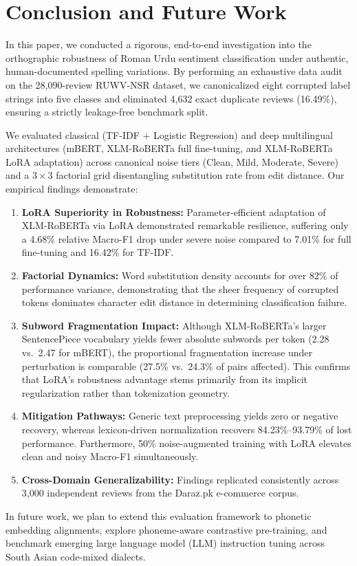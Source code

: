 \section{Conclusion and Future Work}
\label{sec:conclusion}

In this paper, we conducted a rigorous, end-to-end investigation into the orthographic robustness of Roman Urdu sentiment classification under authentic, human-documented spelling variations. By performing an exhaustive data audit on the 28,090-review RUWV-NSR dataset, we canonicalized eight corrupted label strings into five classes and eliminated 4,632 exact duplicate reviews (16.49\%), ensuring a strictly leakage-free benchmark split.

We evaluated classical (TF-IDF + Logistic Regression) and deep multilingual architectures (mBERT, XLM-RoBERTa full fine-tuning, and XLM-RoBERTa LoRA adaptation) across canonical noise tiers (Clean, Mild, Moderate, Severe) and a $3 \times 3$ factorial grid disentangling substitution rate from edit distance. Our empirical findings demonstrate:
\begin{enumerate}
    \item \textbf{LoRA Superiority in Robustness:} Parameter-efficient adaptation of XLM-RoBERTa via LoRA demonstrated remarkable resilience, suffering only a 4.68\% relative Macro-F1 drop under severe noise compared to 7.01\% for full fine-tuning and 16.42\% for TF-IDF.
    \item \textbf{Factorial Dynamics:} Word substitution density accounts for over 82\% of performance variance, demonstrating that the sheer frequency of corrupted tokens dominates character edit distance in determining classification failure.
    \item \textbf{Subword Fragmentation Impact:} Although XLM-RoBERTa's larger SentencePiece vocabulary yields fewer absolute subwords per token (2.28 vs.\ 2.47 for mBERT), the proportional fragmentation increase under perturbation is comparable (27.5\% vs.\ 24.3\% of pairs affected). This confirms that LoRA's robustness advantage stems primarily from its implicit regularization rather than tokenization geometry.
    \item \textbf{Mitigation Pathways:} Generic text preprocessing yields zero or negative recovery, whereas lexicon-driven normalization recovers 84.23\%--93.79\% of lost performance. Furthermore, 50\% noise-augmented training with LoRA elevates clean and noisy Macro-F1 simultaneously.
    \item \textbf{Cross-Domain Generalizability:} Findings replicated consistently across 3,000 independent reviews from the Daraz.pk e-commerce corpus.
\end{enumerate}

In future work, we plan to extend this evaluation framework to phonetic embedding alignments, explore phoneme-aware contrastive pre-training, and benchmark emerging large language model (LLM) instruction tuning across South Asian code-mixed dialects.
